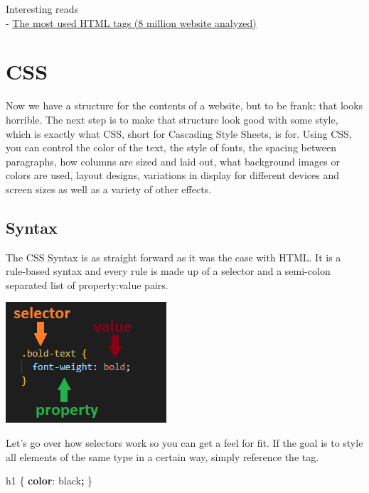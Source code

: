 \documentclass[
]{book}
\newenvironment{Shaded}{\begin{snugshade}}{\end{snugshade}}
\newcommand{\ConstantTok}[1]{\textcolor[rgb]{0.00,0.00,0.00}{#1}}
\newcommand{\KeywordTok}[1]{\textcolor[rgb]{0.13,0.29,0.53}{\textbf{#1}}}
\newcommand{\NormalTok}[1]{#1}
\newcommand{\OperatorTok}[1]{\textcolor[rgb]{0.81,0.36,0.00}{\textbf{#1}}}
\begin{document}
Interesting reads\\
- \href{https://css-tricks.com/average-web-page-data-analyzing-8-million-websites/}{The most used HTML tags (8 million website analyzed)}

\hypertarget{css}{%
\section{CSS}\label{css}}

Now we have a structure for the contents of a website, but to be frank: that looks horrible. The next step is to make that structure look good with some style, which is exactly what CSS, short for Cascading Style Sheets, is for. Using CSS, you can control the color of the text, the style of fonts, the spacing between paragraphs, how columns are sized and laid out, what background images or colors are used, layout designs, variations in display for different devices and screen sizes as well as a variety of other effects.

\hypertarget{syntax}{%
\subsection*{Syntax}\label{syntax}}

The CSS Syntax is as straight forward as it was the case with HTML. It is a rule-based syntax and every rule is made up of a selector and a semi-colon separated list of property:value pairs.

\includegraphics{docs/assets/css_example.png}

Let's go over how selectors work so you can get a feel for fit. If the goal is to style all elements of the same type in a certain way, simply reference the tag.

\begin{Shaded}
\begin{Highlighting}[]
\NormalTok{h1 \{}
  \KeywordTok{color}\NormalTok{: }\ConstantTok{black}\OperatorTok{;}
\NormalTok{\}}
\end{Highlighting}
\end{Shaded}
\end{document}
